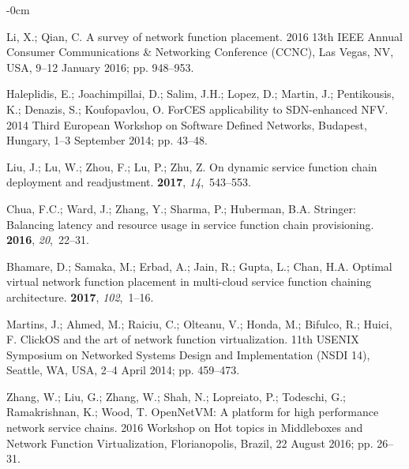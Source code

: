 \documentclass[futureinternet,review,accept,pdftex,moreauthors]{Definitions/mdpi}
\begin{document}
\begin{adjustwidth}{-\extralength}{0cm}
\begin{thebibliography}{999}
Li, X.; Qian, C.
\newblock A survey of network function placement.
 2016 13th IEEE Annual Consumer Communications \& Networking
  Conference (CCNC),  Las Vegas, NV, USA,  9--12 January 2016; pp. 948--953.

Haleplidis, E.; Joachimpillai, D.; Salim, J.H.; Lopez, D.; Martin, J.;
  Pentikousis, K.; Denazis, S.; Koufopavlou, O.
\newblock ForCES applicability to SDN-enhanced NFV.
 2014 Third European Workshop on Software Defined Networks,  Budapest, Hungary, 1--3 September 2014; pp. 43--48.

Liu, J.; Lu, W.; Zhou, F.; Lu, P.; Zhu, Z.
\newblock On dynamic service function chain deployment and readjustment.
 {\bf 2017},
  {\em 14},~543--553.

Chua, F.C.; Ward, J.; Zhang, Y.; Sharma, P.; Huberman, B.A.
\newblock Stringer: Balancing latency and resource usage in service function
  chain provisioning.
 {\bf 2016}, {\em 20},~22--31.

Bhamare, D.; Samaka, M.; Erbad, A.; Jain, R.; Gupta, L.; Chan, H.A.
\newblock Optimal virtual network function placement in multi-cloud service
  function chaining architecture.
 {\bf 2017}, {\em 102},~1--16.

Martins, J.; Ahmed, M.; Raiciu, C.; Olteanu, V.; Honda, M.; Bifulco, R.; Huici,
  F.
\newblock ClickOS and the art of network function virtualization.
 11th USENIX Symposium on Networked Systems Design and
  Implementation (NSDI 14),  Seattle, WA, USA, 2--4 April 2014; pp. 459--473.

Zhang, W.; Liu, G.; Zhang, W.; Shah, N.; Lopreiato, P.; Todeschi, G.;
  Ramakrishnan, K.; Wood, T.
\newblock OpenNetVM: A platform for high performance network service chains.
 2016 Workshop on Hot topics in Middleboxes and
  Network Function Virtualization,  Florianopolis, Brazil, 22 August 2016; pp. 26--31.


\end{thebibliography}
\end{adjustwidth}
\end{document}
